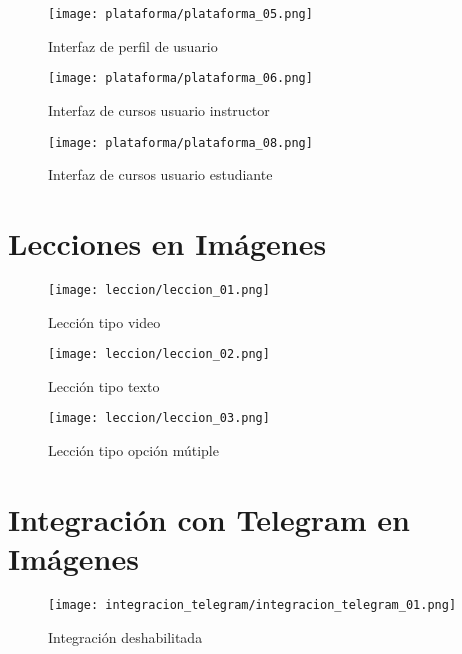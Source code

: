 \begin{figure}[H]
    \centering
    \texttt{[image: plataforma/plataforma\_05.png]}
    \caption{Interfaz de perfil de usuario}
    \label{fig:interfaz_sistema_perfil_usuario}
\end{figure}

\begin{figure}[H]
    \centering
    \texttt{[image: plataforma/plataforma\_06.png]}
    \caption{Interfaz de cursos usuario instructor}
    \label{fig:interfaz_sistema_cursos_usuario_instructor}
\end{figure}

\begin{figure}[H]
    \centering
    \texttt{[image: plataforma/plataforma\_08.png]}
    \caption{Interfaz de cursos usuario estudiante}
    \label{fig:interfaz_sistema_cursos_usuario_estudiante}
\end{figure}


\section{Lecciones en Imágenes}

\begin{figure}[H]
    \centering
    \texttt{[image: leccion/leccion\_01.png]}
    \caption{Lección tipo video}
    \label{fig:leccion_video}
\end{figure}

\begin{figure}[H]
    \centering
    \texttt{[image: leccion/leccion\_02.png]}
    \caption{Lección tipo texto}
    \label{fig:leccion_texto}
\end{figure}

\begin{figure}[H]
    \centering
    \texttt{[image: leccion/leccion\_03.png]}
    \caption{Lección tipo opción mútiple}
    \label{fig:leccion_opcion_multiple}
\end{figure}

\section{Integración con Telegram en Imágenes}

\begin{figure}[H]
    \centering
    \texttt{[image: integracion\_telegram/integracion\_telegram\_01.png]}
    \caption{Integración deshabilitada}
    \label{fig:integracion_telegram_deshabilitada}
\end{figure}

